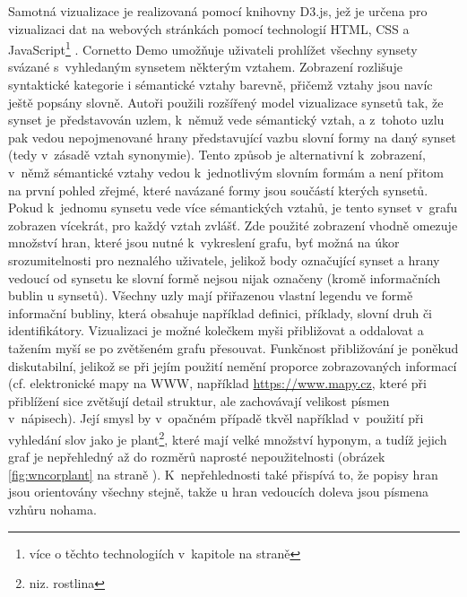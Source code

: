 \documentclass[a4paper,11pt,openany,twoside]{book}
\newcommand{\itNameRef}[1]{\textit{\nameref{#1}}}
\newcommand\ex{\textsf}
\begin{document}
					Samotná vizualizace je realizovaná pomocí knihovny D3.js, jež je určena pro vizualizaci dat na webových stránkách pomocí technologií HTML, CSS a JavaScript\footnote{více o těchto technologiích v~kapitole \itNameRef{cha:techno} na straně \pageref{cha:techno}} \parencite{d3web}. Cornetto Demo umožňuje uživateli prohlížet všechny synsety svázané s~vyhledaným synsetem některým vztahem. Zobrazení rozlišuje syntaktické kategorie i sémantické vztahy barevně, přičemž vztahy jsou navíc ještě popsány slovně. Autoři použili rozšířený model vizualizace synsetů tak, že synset je představován uzlem, k~němuž vede sémantický vztah, a z~tohoto uzlu pak vedou nepojmenované hrany představující vazbu slovní formy na daný synset (tedy v~zásadě vztah synonymie). Tento způsob je alternativní k~zobrazení, v~němž sémantické vztahy vedou k~jednotlivým slovním formám a není přitom na první pohled zřejmé, které navázané formy jsou součástí kterých synsetů. Pokud k~jednomu synsetu vede více sémantických vztahů, je tento synset v~grafu zobrazen vícekrát, pro každý vztah zvlášť. Zde použité zobrazení vhodně omezuje množství hran, které jsou nutné k~vykreslení grafu, byť možná na úkor srozumitelnosti pro neznalého uživatele, jelikož body označující synset a hrany vedoucí od synsetu ke slovní formě nejsou nijak označeny (kromě informačních bublin u synsetů). Všechny uzly mají přiřazenou vlastní legendu ve formě informační bubliny, která obsahuje například definici, příklady, slovní druh či identifikátory. Vizualizaci je možné kolečkem myši přibližovat a oddalovat a tažením myší se po zvětšeném grafu přesouvat. Funkčnost přibližování je poněkud diskutabilní, jelikož se při jejím použití nemění proporce zobrazovaných informací (cf. elektronické mapy na WWW, například \url{https://www.mapy.cz}, které při přiblížení sice zvětšují detail struktur, ale zachovávají velikost písmen v~nápisech). Její smysl by v~opačném případě tkvěl například v~použití při vyhledání slov jako je \ex{plant}\footnote{niz. \ex{rostlina}}, které mají velké množství hyponym, a tudíž jejich graf je nepřehledný až do rozměrů naprosté nepoužitelnosti (obrázek \ref{fig:wncorplant} na straně \pageref{fig:wncorplant}). K~nepřehlednosti také přispívá to, že popisy hran jsou orientovány všechny stejně, takže u hran vedoucích doleva jsou písmena vzhůru nohama.
\end{document}

